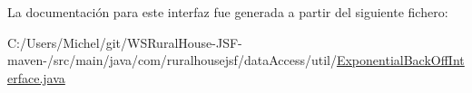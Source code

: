 La documentación para este interfaz fue generada a partir del siguiente fichero\+:\begin{DoxyCompactItemize}
\item 
C\+:/\+Users/\+Michel/git/\+W\+S\+Rural\+House-\/\+J\+S\+F-\/maven-\//src/main/java/com/ruralhousejsf/data\+Access/util/\mbox{\hyperlink{_exponential_back_off_interface_8java}{Exponential\+Back\+Off\+Interface.\+java}}\end{DoxyCompactItemize}
